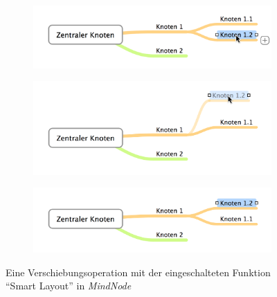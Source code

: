 \begin{figure}[hbt]
    \newcommand{\subfigurewidth}{\textwidth}
    \newcommand{\graphicswidth}{0.7\linewidth}
    \begin{subfigure}{\subfigurewidth}
        \centering
        \includegraphics[width=\graphicswidth]{resources/mindnode-smart-layout-a}
        \caption{}
        \label{fig:mindnode-smart-layout-a}
    \end{subfigure}
    \begin{subfigure}{\subfigurewidth}
        \centering
        \includegraphics[width=\graphicswidth]{resources/mindnode-smart-layout-b}
        \caption{}
        \label{fig:mindnode-smart-layout-b}
    \end{subfigure}
    \begin{subfigure}{\subfigurewidth}
        \centering
        \includegraphics[width=\graphicswidth]{resources/mindnode-smart-layout-c}
        \caption{}
        \label{fig:mindnode-smart-layout-c}
    \end{subfigure}
    \caption{Eine Verschiebungsoperation mit der eingeschalteten Funktion \enquote{Smart Layout} in \textit{MindNode}}
    \label{fig:mindnode-smart-layout}
\end{figure}


